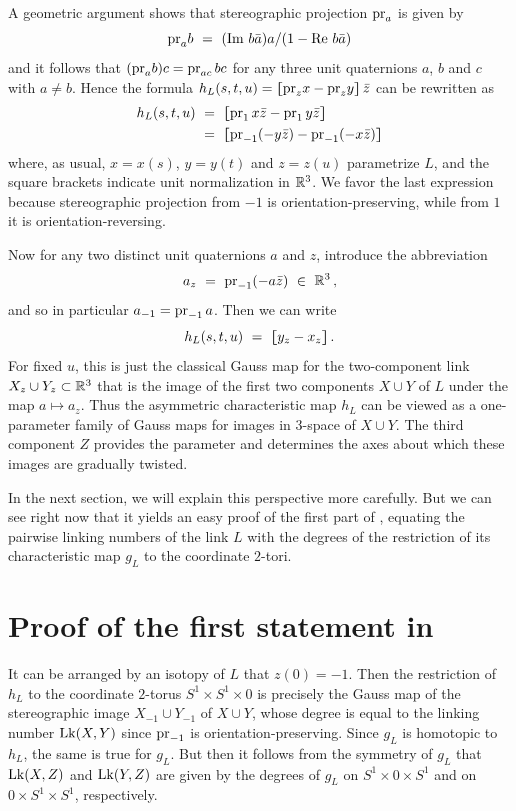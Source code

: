 A geometric argument shows that stereographic projection $\mathrm{pr}_a$ is given by 
$$
\mathrm{pr}_ab \ = \ (\mathrm{Im\,}\,b\bar a)a/(1-\mathrm{Re\,}\,b\bar a)
$$
and it follows that $(\mathrm{pr}_ab)c  = \mathrm{pr}_{ac}\,bc$ for any three unit quaternions $a$, $b$ and $c$ with $a\ne b$.  Hence the formula $h_L(s,t,u) = \lceil\!\!\!\hskip.01in \lfloor \mathrm{pr}_zx-\mathrm{pr}_zy \rceil\!\!\!\hskip.01in\rfloor\, \bar z$ can be rewritten as
$$
\begin{aligned}
h_L(s,t,u) \ &= \ \norm{\pr_1\,x\zbar - \pr_1\,y\zbar} \\
&= \ \norm{\pr_{-1}(-y\zbar) - \pr_{-1}(-x\zbar)}
\end{aligned}
$$
where, as usual, $x=x(s)$, $y=y(t)$ and $z=z(u)$ parametrize $L$, and the square brackets indicate unit normalization in $\mathbb R^3$.  We favor the last expression because stereographic projection from $-1$ is orientation-preserving, while from $1$ it is orientation-reversing.  

Now for any two distinct unit quaternions $a$ and $z$, introduce the abbreviation
$$
a_z \ = \ \pr_{-1}(-a\zbar) \ \in \ \br^3\,,
$$
and so in particular $a_{-1} = \mathrm{pr}_{-1}\,a$.  Then we can write
$$
h_L(s,t,u) \ = \ \lceil\!\!\!\hskip.01in \lfloor y_z-x_z \rceil\!\!\!\hskip.01in\rfloor\,.
$$
For fixed $u$, this is just the classical Gauss map for the two-component link $X_z\cup Y_z \subset \mathbb R^3$ that is the image of the first two components $X\cup Y$ of $L$ under the map $a\mapsto a_z$.  
Thus the asymmetric characteristic map $h_L$ can be viewed as a one-parameter family of Gauss maps for images in $3$-space of $X\cup Y$.  The third component $Z$ provides the parameter and determines the axes about which these images are gradually twisted.

In the next section, we will explain this perspective more carefully.  But we can see right now that it yields an easy proof of the first part of , equating the pairwise linking numbers of the link $L$ with the degrees of the restriction of its characteristic map $g_L$ to the coordinate $2$-tori.

\part{Proof of the first statement in }

It can be arranged by an isotopy of $L$ that $z(0) = -1$.  Then the restriction of $h_L$ to the coordinate $2$-torus $S^1\times S^1\times 0$ is precisely the Gauss map of the stereographic image $X_{-1}\cup Y_{-1}$ of $X\cup Y$, whose degree is equal to the linking number $\mathrm{Lk}(X, Y )$ since $\mathrm{pr}_{-1}$ is orientation-preserving. Since $g_L$ is homotopic to $h_L$, the same is true for $g_L$.  But then it follows from the symmetry of $g_L$ that $\mathrm{Lk}(X,Z)$ and $\mathrm{Lk}(Y,Z)$ are given by the degrees of $g_L$ on $S^1\times 0\times S^1$ and on $0 \times S^1\times S^1$, respectively. 

